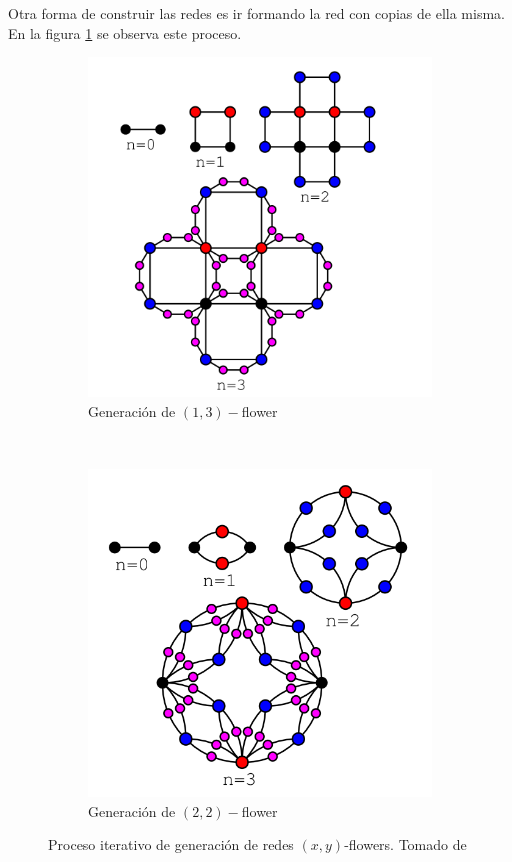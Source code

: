 Otra forma de construir las redes es ir formando la red con copias de ella misma. En la figura \ref{fig:florGeneradas} se observa este proceso.

\begin{figure}[H]
    \centering
    \begin{subfigure}[b]{0.5\textwidth}
        \includegraphics[width=\textwidth]{Capitulo3GeneracionRedesFractales/imagenes/florB.png}
        \caption{Generación de $(1,3)-$flower}
    \end{subfigure}~
    \begin{subfigure}[b]{0.5\textwidth}
        \includegraphics[width=\textwidth]{Capitulo3GeneracionRedesFractales/imagenes/florC.png}
        \caption{Generación de $(2,2)-$flower} 
    \end{subfigure}
    \caption{Proceso iterativo de generación de redes $(x,y)$-flowers. Tomado de \cite{Lin2011}}
    \label{fig:florGeneradas}
\end{figure}